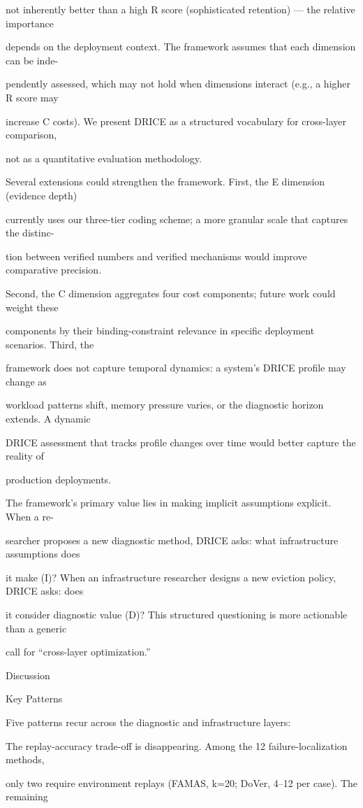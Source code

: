 \begin{flushleft}
\noindent not inherently better than a high R score (sophisticated retention) — the relative importance\par
\noindent depends on the deployment context. The framework assumes that each dimension can be inde-\par
\noindent pendently assessed, which may not hold when dimensions interact (e.g., a higher R score may\par
\noindent increase C costs). We present DRICE as a structured vocabulary for cross-layer comparison,\par
\noindent not as a quantitative evaluation methodology.\par
\noindent  Several extensions could strengthen the framework. First, the E dimension (evidence depth)\par
\noindent currently uses our three-tier coding scheme; a more granular scale that captures the distinc-\par
\noindent tion between verified numbers and verified mechanisms would improve comparative precision.\par
\noindent Second, the C dimension aggregates four cost components; future work could weight these\par
\noindent components by their binding-constraint relevance in specific deployment scenarios. Third, the\par
\noindent framework does not capture temporal dynamics: a system’s DRICE profile may change as\par
\noindent workload patterns shift, memory pressure varies, or the diagnostic horizon extends. A dynamic\par
\noindent DRICE assessment that tracks profile changes over time would better capture the reality of\par
\noindent production deployments.\par
\noindent  The framework’s primary value lies in making implicit assumptions explicit. When a re-\par
\noindent searcher proposes a new diagnostic method, DRICE asks: what infrastructure assumptions does\par
\noindent it make (I)? When an infrastructure researcher designs a new eviction policy, DRICE asks: does\par
\noindent it consider diagnostic value (D)? This structured questioning is more actionable than a generic\par
\noindent call for “cross-layer optimization.”\par
\par\smallskip
\par\smallskip
{} Discussion\par
{} Key Patterns\par
\noindent Five patterns recur across the diagnostic and infrastructure layers:\par
\par\smallskip
\noindent The replay-accuracy trade-off is disappearing. Among the 12 failure-localization methods,\par
\noindent only two require environment replays (FAMAS, k=20; DoVer, 4–12 per case). The remaining\par
\end{flushleft}
